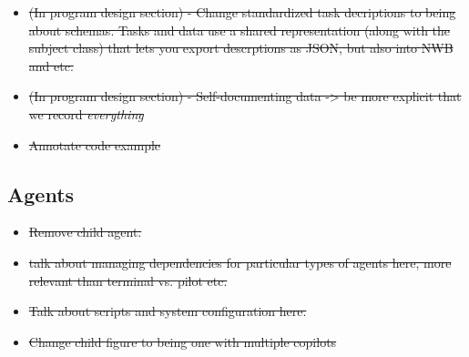 \begin{itemize}
\item \sout{(In program design section) - Change standardized task decriptions to being about schemas. Tasks and data use a shared representation (along with the subject class) that lets you export descrptions as JSON, but also into NWB and etc.}
\item \sout{(In program design section) - Self-documenting data -> be more explicit that we record \textit{everything}}
\item \sout{Annotate code example}
\end{itemize}


\subsection{Agents}

\begin{itemize}
\item \sout{Remove child agent.}
\item \sout{talk about managing dependencies for particular types of agents here, more relevant than terminal vs. pilot etc.}
\item \sout{Talk about scripts and system configuration here.}
\item \sout{Change child figure to being one with multiple copilots}
\end{itemize}

